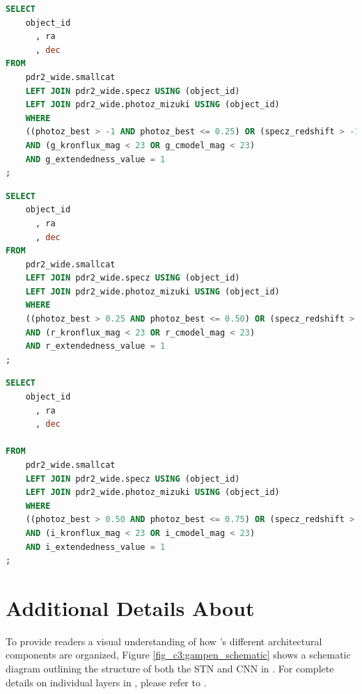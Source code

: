 \begin{lstlisting}[language=SQL, 
    caption={Low-z Sample SQL query}, 
    label={code:sql_low_z}]
SELECT
    object_id
      , ra
      , dec
FROM
    pdr2_wide.smallcat
    LEFT JOIN pdr2_wide.specz USING (object_id)
    LEFT JOIN pdr2_wide.photoz_mizuki USING (object_id)
    WHERE
    ((photoz_best > -1 AND photoz_best <= 0.25) OR (specz_redshift > -1 AND specz_redshift <= 0.25))
    AND (g_kronflux_mag < 23 OR g_cmodel_mag < 23)
    AND g_extendedness_value = 1
;
\end{lstlisting}

\begin{lstlisting}[language=SQL, 
    caption={Mid-z Sample SQL query}, 
    label={code:sql_mid_z}]
SELECT
    object_id
      , ra
      , dec
FROM
    pdr2_wide.smallcat
    LEFT JOIN pdr2_wide.specz USING (object_id)
    LEFT JOIN pdr2_wide.photoz_mizuki USING (object_id)
    WHERE
    ((photoz_best > 0.25 AND photoz_best <= 0.50) OR (specz_redshift > 0.25 AND specz_redshift <= 0.50))
    AND (r_kronflux_mag < 23 OR r_cmodel_mag < 23)
    AND r_extendedness_value = 1
;
\end{lstlisting}


\begin{lstlisting}[language=SQL, 
    caption={High-z Sample SQL query}, 
    label={code:sql_high_z}]
SELECT
    object_id
      , ra
      , dec
      
FROM
    pdr2_wide.smallcat
    LEFT JOIN pdr2_wide.specz USING (object_id)
    LEFT JOIN pdr2_wide.photoz_mizuki USING (object_id)
    WHERE
    ((photoz_best > 0.50 AND photoz_best <= 0.75) OR (specz_redshift > 0.50 AND specz_redshift <= 0.75))
    AND (i_kronflux_mag < 23 OR i_cmodel_mag < 23)
    AND i_extendedness_value = 1
;
\end{lstlisting}


\section{Additional Details About \gampen{}}\label{ap:gampen}

To provide readers a visual understanding of how \gampen{}'s different architectural components are organized, Figure \ref{fig_c3:gampen_schematic} shows a schematic diagram outlining the structure of both the STN and CNN in \gampen{}. For complete details on individual layers in \gampen{}, please refer to \citet{gampen_software_paper}.

